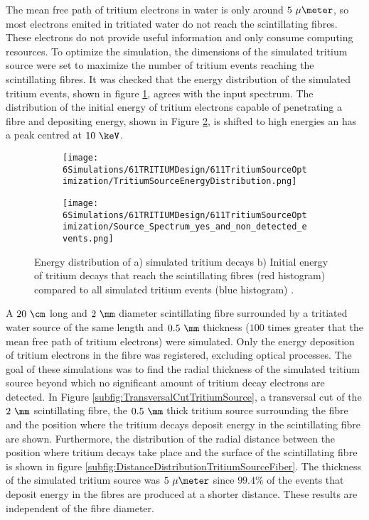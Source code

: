 The mean free path of tritium electrons in water is only around $5~\mu\meter$, so most electrons emited in tritiated water do not reach the scintillating fibres. These electrons do not provide useful information and only consume computing resources. To optimize the simulation, the dimensions of the simulated tritium source were set to maximize the number of tritium events reaching the scintillating fibres. It was checked that the energy distribution of the simulated tritium events, shown in figure \ref{subfig:EnergyDistributionTritiumSource}, agrees with the input spectrum. The distribution of the initial energy of tritium electrons capable of penetrating a fibre and depositing energy, shown in Figure \ref{subfig:EnergySpectrumEventsDetectedandNonDetected}, is shifted to high energies an has a peak centred at $10~\keV$. 

\begin{figure}
\centering
    \begin{subfigure}[b]{0.45\textwidth}
    \centering
    \texttt{[image: 6Simulations/61TRITIUMDesign/611TritiumSourceOptimization/TritiumSourceEnergyDistribution.png]}  
    \caption{\label{subfig:EnergyDistributionTritiumSource}}
    \end{subfigure}
    \hfill
    \begin{subfigure}[b]{0.45\textwidth}
    \centering
    \texttt{[image: 6Simulations/61TRITIUMDesign/611TritiumSourceOptimization/Source\_Spectrum\_yes\_and\_non\_detected\_events.png]}  
    \caption{\label{subfig:EnergySpectrumEventsDetectedandNonDetected}}
    \end{subfigure}
 \caption{Energy distribution of a) simulated tritium decays b) Initial energy of tritium decays that reach the scintillating fibres (red histogram) compared to all simulated tritium events (blue histogram) \cite{SimulationPaperCarlos}.
 \label{fig:TritiumSourceOptimization}}
\end{figure}

A $20~\cm$ long and $2~\mm$ diameter scintillating fibre surrounded by a tritiated water source of the same length and $0.5~\mm$ thickness ($100$ times greater that the mean free path of tritium electrons) were simulated. Only the energy deposition of tritium electrons in the fibre was registered, excluding optical processes. The goal of these simulations was to find the radial thickness of the simulated tritium source beyond which no significant amount of tritium decay electrons are detected. In Figure \ref{subfig:TransversalCutTritiumSource}, a transversal cut of the $2~\mm$ scintillating fibre, the $0.5~\mm$ thick tritium source surrounding the fibre and the position where the tritium decays deposit energy in the scintillating fibre are shown. Furthermore, the distribution of the radial distance between the position where tritium decays take place and the surface of the scintillating fibre is shown in figure \ref{subfig:DistanceDistributionTritiumSourceFiber}. The thickness of the simulated tritium source was $5~\mu\meter$ since $99.4\%$ of the events that deposit energy in the fibres are produced at a shorter distance. These results are independent of the fibre diameter.

